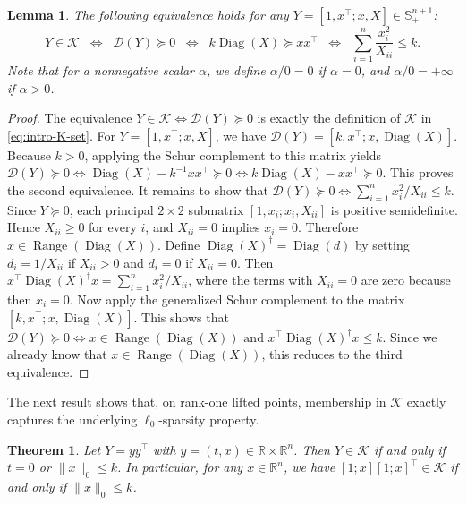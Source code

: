 \documentclass[11pt]{article}
\DeclareMathOperator{\Diag}{Diag}
\def\D{\mathcal{D}}
\def\K{\mathcal{K}}
\def\R{\mathbb{R}}
\def\S{\mathbb{S}}
\def\Range{{\operatorname{Range}}}
\theoremstyle{plain}
\newtheorem{theorem}{Theorem}
\newtheorem{lemma}{Lemma}
\begin{document}
\begin{lemma}
\label{lemma:equivalence}
The following equivalence holds for any $Y=[1,x^\top; x, X]\in\S^{n+1}_+$:
\begin{equation}\label{eq:kDiag-xx-general}
   Y\in\K
   \;\; \Longleftrightarrow\;\;
    \D(Y)\succeq 0
\;\; \Longleftrightarrow\;\;
k\Diag(X)\succeq xx^\top 
\;\; \Longleftrightarrow\;\;
    \sum_{i=1}^n \frac{x_i^2}{X_{ii}}\leq k.
\end{equation}
Note that for a nonnegative scalar $\alpha$, we define 
$\alpha/0 = 0$ if $\alpha = 0$, and $\alpha/0 = +\infty$ if $\alpha > 0$.
\end{lemma}

\begin{proof}\;
The equivalence $Y\in\K \Longleftrightarrow \D(Y)\succeq 0$ is exactly the definition of $\K$ in \eqref{eq:intro-K-set}. For $Y=[1,x^\top; x, X]$, we have $\D(Y)=[k,x^\top; x, \Diag(X)]$. Because $k>0$, applying the Schur complement to this matrix yields
 $\D(Y)\succeq 0 \Longleftrightarrow \Diag(X)-k^{-1}xx^\top\succeq 0 \Longleftrightarrow k\Diag(X)-xx^\top\succeq 0$.
This proves the second equivalence.
It remains to show that $\D(Y)\succeq 0 \Longleftrightarrow \sum_{i=1}^n x_i^2/X_{ii}\le k$.
Since $Y\succeq 0$, each principal $2\times 2$ submatrix $[1,x_i; x_i, X_{ii}]$ is positive semidefinite. Hence $X_{ii}\ge 0$ for every $i$, and $X_{ii}=0$ implies $x_i=0$. Therefore $x\in\Range(\Diag(X))$. Define $\Diag(X)^\dagger=\Diag(d)$ by setting $d_i=1/X_{ii}$ if $X_{ii}>0$ and $d_i=0$ if $X_{ii}=0$. Then
 $x^\top \Diag(X)^\dagger x = \sum_{i=1}^n x_i^2/X_{ii}$,
where the terms with $X_{ii}=0$ are zero because then $x_i=0$.
Now apply the generalized Schur complement to the matrix $[k,x^\top; x, \Diag(X)]$. This shows that
 $\D(Y)\succeq 0 \Longleftrightarrow x\in\Range(\Diag(X)) \text{ and } x^\top \Diag(X)^\dagger x\le k$.
Since we already know that $x\in\Range(\Diag(X))$, this reduces to the third equivalence.
\end{proof}



The next result shows that, on rank-one lifted points, membership in $\K$ exactly captures the underlying $\ell_0$-sparsity property.
\begin{theorem}
\label{thm:equivalence-K}
Let $Y=yy^\top$ with $y=(t,x)\in\R\times\R^n$. Then $Y\in\K$ if and only if $t=0$ or $\|x\|_0\le k$. In particular, for any $x\in\R^n$, we have $[1; x][1; x]^\top\in\K$ if and only if $\|x\|_0\le k$.
\end{theorem}
\end{document}
